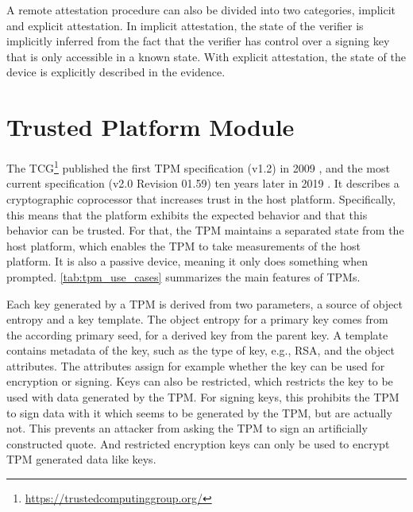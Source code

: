 A remote attestation procedure can also be divided into two categories, implicit and explicit attestation.
In implicit attestation, the state of the verifier is implicitly inferred from the fact that the verifier has control over a signing key that is only accessible in a known state.
With explicit attestation, the state of the device is explicitly described in the evidence.

\section{Trusted Platform Module}
\label{sec:tpm}

The \ac{TCG}\footnote{\url{https://trustedcomputinggroup.org/}} published the first TPM specification (v1.2) in 2009 \cite{ISO11889}, and the most current specification (v2.0 Revision 01.59) ten years later in 2019 \cite{tpm}.
It describes a cryptographic coprocessor that increases trust in the host platform. Specifically, this means that the platform exhibits the expected behavior and that this behavior can be trusted.
For that, the TPM maintains a separated state from the host platform, which enables the TPM to take measurements of the host platform.
It is also a passive device, meaning it only does something when prompted.
\autoref{tab:tpm_use_cases} summarizes the main features of TPMs.



Each key generated by a TPM is derived from two parameters, a source of object entropy and a key template.
The object entropy for a primary key comes from the according primary seed, for a derived key from the parent key.
A template contains metadata of the key, such as the type of key, e.g., RSA, and the object attributes.
The attributes assign for example whether the key can be used for encryption or signing.
Keys can also be restricted, which restricts the key to be used with data generated by the TPM.
For signing keys, this prohibits the TPM to sign data with it which seems to be generated by the TPM, but are actually not.
This prevents an attacker from asking the TPM to sign an artificially constructed quote.
And restricted encryption keys can only be used to encrypt TPM generated data like keys.


